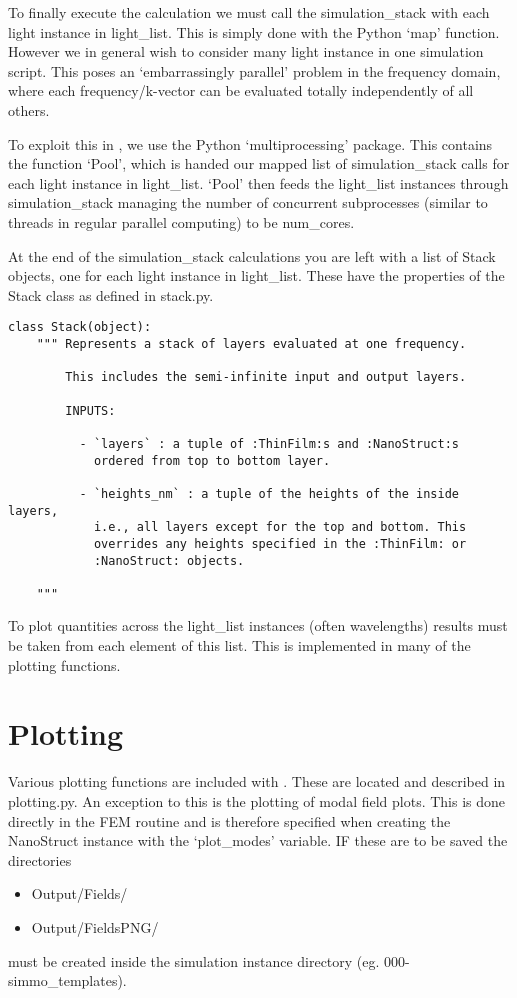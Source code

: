 \documentclass[11pt,a4paper,twoside]{report}
\begin{document}
To finally execute the calculation we must call the simulation\_stack with each light instance in light\_list. This is simply done with the Python `map' function. However we in general wish to consider many light instance in one simulation script. This poses an `embarrassingly parallel' problem in the frequency domain, where each frequency/k-vector can be evaluated totally independently of all others. 

To exploit this in \CodeName, we use the Python `multiprocessing' package. This contains the function `Pool', which is handed our mapped list of simulation\_stack calls for each light instance in light\_list. `Pool' then feeds the light\_list instances through simulation\_stack managing the number of concurrent subprocesses (similar to threads in regular parallel computing) to be num\_cores.


At the end of the simulation\_stack calculations you are left with a list of Stack objects, one for each light instance in light\_list. These have the properties of the Stack class as defined in stack.py.

\begin{lstlisting}
class Stack(object):
    """ Represents a stack of layers evaluated at one frequency.

        This includes the semi-infinite input and output layers.

        INPUTS:

          - `layers` : a tuple of :ThinFilm:s and :NanoStruct:s 
            ordered from top to bottom layer.

          - `heights_nm` : a tuple of the heights of the inside layers,
            i.e., all layers except for the top and bottom. This 
            overrides any heights specified in the :ThinFilm: or
            :NanoStruct: objects.

    """
\end{lstlisting}

To plot quantities across the light\_list instances (often wavelengths) results must be taken from each element of this list. This is implemented in many of the plotting functions.




\section{Plotting}
Various plotting functions are included with \CodeName. These are located and described in plotting.py.
An exception to this is the plotting of modal field plots. This is done directly in the FEM routine and is therefore specified when creating the NanoStruct instance with the `plot\_modes' variable. IF these are to be saved the directories 
\begin{itemize}
\item Output/Fields/
\item Output/FieldsPNG/
\end{itemize}
must be created inside the simulation instance directory (eg. 000-simmo\_templates).
\end{document}
